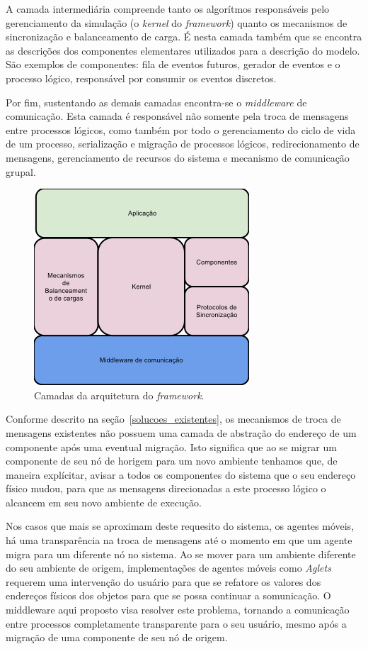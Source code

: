 A camada intermediária compreende tanto os algorítmos responsáveis pelo gerenciamento da simulação (o \textit{kernel} do \textit{framework}) quanto os mecanismos de sincronização e balanceamento de carga. É nesta camada também que se encontra as descrições dos componentes elementares utilizados para a descrição do modelo. São exemplos de componentes: fila de eventos futuros, gerador de eventos e o processo lógico, responsável por consumir os eventos discretos.

Por fim, sustentando as demais camadas encontra-se o \textit{middleware} de comunicação. Esta camada é responsável não somente pela troca de mensagens entre processos lógicos, como também por todo o gerenciamento do ciclo de vida de um processo, serialização e migração de processos lógicos, redirecionamento de mensagens, gerenciamento de recursos do sistema e mecanismo de comunicação grupal. 

\begin{figure}
  \centerline{\includegraphics{arquitetura_macro.png}}
  \caption{Camadas da arquitetura do \textit{framework}.}
\label{fig:arquitetura_macro}
\end{figure}

Conforme descrito na seção~\ref{solucoes_existentes}, os mecanismos de troca de mensagens existentes não possuem uma camada de abstração do endereço de um componente após uma eventual migração. Isto significa que ao se migrar um componente de seu nó de horigem para um novo ambiente tenhamos que, de maneira explícitar, avisar a todos os componentes do sistema que o seu endereço físico mudou, para que as mensagens direcionadas a este processo lógico o alcancem em seu novo ambiente de execução.

Nos casos que mais se aproximam deste requesito do sistema, os agentes móveis, há uma transparência na troca de mensagens até o momento em que um agente migra para um diferente nó no sistema. Ao se mover para um ambiente diferente do seu ambiente de origem, implementações de agentes móveis como \textit{Aglets} requerem uma intervenção do usuário para que se refatore os valores dos endereços físicos dos objetos para que se possa continuar a somunicação. O middleware aqui proposto visa resolver este problema, tornando a comunicação entre processos completamente transparente para o seu usuário, mesmo após a migração de uma componente de seu nó de origem.

